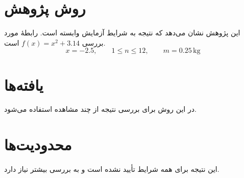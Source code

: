 \section*{روش پژوهش}
این پژوهش نشان می‌دهد که نتیجه به شرایط آزمایش وابسته است.
رابطهٔ مورد بررسی $f(x)=x^2+3.14$ است.
\[
  x=-2.5,\qquad 1 \leq n \leq 12,\qquad m=0.25\,\mathrm{kg}
\]
\clearpage
\section*{یافته‌ها}
در این روش برای بررسی نتیجه از چند مشاهده استفاده می‌شود.
\clearpage
\section*{محدودیت‌ها}
این نتیجه برای همه شرایط تأیید نشده است و به بررسی بیشتر نیاز دارد.
